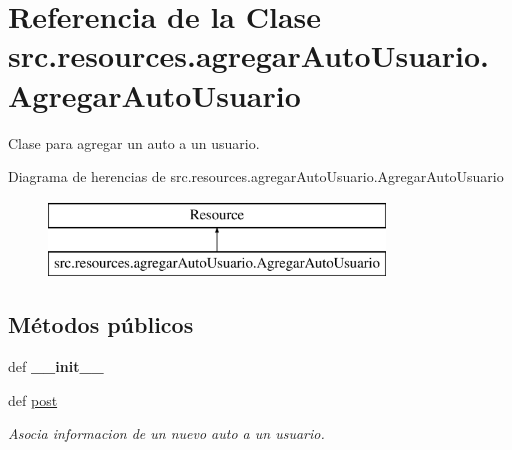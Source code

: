 \hypertarget{classsrc_1_1resources_1_1agregar_auto_usuario_1_1_agregar_auto_usuario}{\section{Referencia de la Clase src.\-resources.\-agregar\-Auto\-Usuario.\-Agregar\-Auto\-Usuario}
\label{classsrc_1_1resources_1_1agregar_auto_usuario_1_1_agregar_auto_usuario}
}


Clase para agregar un auto a un usuario.  


Diagrama de herencias de src.\-resources.\-agregar\-Auto\-Usuario.\-Agregar\-Auto\-Usuario\begin{figure}[H]
\begin{center}
\leavevmode
\includegraphics[height=2.000000cm]{classsrc_1_1resources_1_1agregar_auto_usuario_1_1_agregar_auto_usuario}
\end{center}
\end{figure}
\subsection*{Métodos públicos}
\begin{DoxyCompactItemize}
\item 
\hypertarget{classsrc_1_1resources_1_1agregar_auto_usuario_1_1_agregar_auto_usuario_ac497db4fdc43f3f587b2941704c1f3fd}{def {\bfseries \-\_\-\-\_\-init\-\_\-\-\_\-}}\label{classsrc_1_1resources_1_1agregar_auto_usuario_1_1_agregar_auto_usuario_ac497db4fdc43f3f587b2941704c1f3fd}

\item 
def \hyperlink{classsrc_1_1resources_1_1agregar_auto_usuario_1_1_agregar_auto_usuario_a2ac8095f1edcdd585d80155ddcc12344}{post}
\begin{DoxyCompactList}\small\item\em Asocia informacion de un nuevo auto a un usuario. \end{DoxyCompactList}\end{DoxyCompactItemize}
